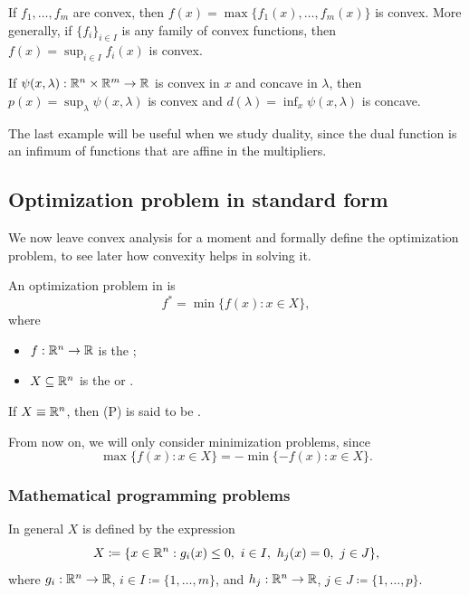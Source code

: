 \begin{theorem}
If $f_1, \dots, f_m$ are convex, then $f(x) = \max\{f_1(x), \dots, f_m(x)\}$ is convex. More generally, if $\{f_i\}_{i \in I}$ is any family of convex functions, then $f(x) = \sup_{i \in I} f_i(x)$ is convex.
\end{theorem}

\begin{example}
If $\psi(x, \lambda): \mathbb{R}^n \times \mathbb{R}^m \to \mathbb{R}$ is convex in $x$ and concave in $\lambda$, then $p(x) = \sup_\lambda \psi(x, \lambda)$ is convex and $d(\lambda) = \inf_x \psi(x, \lambda)$ is concave.
\end{example}

The last example will be useful when we study duality, since the dual function is an infimum of functions that are affine in the multipliers.

\subsection{Optimization problem in standard form}

We now leave convex analysis for a moment and formally define the optimization problem, to see later how convexity helps in solving it.

\begin{definition}
An optimization problem in  is
\[
    f^* = \min \{ f(x) : x \in X \}, \tag{P}
\]
where
\begin{itemize}
    \item $f: \mathbb{R}^n \to \mathbb{R}$ is the ;
    \item $X \subseteq \mathbb{R}^n$ is the  or .
\end{itemize}
If $X \equiv \mathbb{R}^n$, then (P) is said to be .
\end{definition}

From now on, we will only consider minimization problems, since
\[
    \max\{f(x) : x \in X\} = -\min\{-f(x) : x \in X\}.
\]

\subsubsection{Mathematical programming problems}

In general $X$ is defined by the expression
\[
    X \coloneqq \{x \in \mathbb{R}^n : g_i(x) \le 0,\ i \in I,\ h_j(x) = 0,\ j \in J\},
\]
where $g_i: \mathbb{R}^n \to \mathbb{R}$, $i \in I \coloneqq \{1, \dots, m\}$, and $h_j: \mathbb{R}^n \to \mathbb{R}$, $j \in J \coloneqq \{1, \dots, p\}$.

